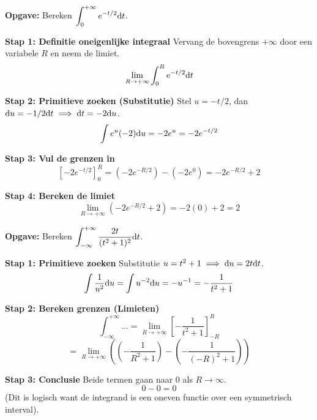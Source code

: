 \begin{oefenblok}
\textbf{Opgave:} Bereken $\displaystyle \int_0^{+\infty} e^{-t/2} \mathrm{d} t$.

\textbf{Stap 1: Definitie oneigenlijke integraal}
Vervang de bovengrens $+\infty$ door een variabele $R$ en neem de limiet.
\[ \lim_{R \to +\infty} \int_0^R e^{-t/2} \mathrm{d} t \]

\textbf{Stap 2: Primitieve zoeken (Substitutie)}
Stel $u = -t/2$, dan $\mathrm{d} u = -1/2 \mathrm{d} t \implies \mathrm{d} t = -2 \mathrm{d} u$.
\[ \int e^u (-2) \mathrm{d} u = -2e^u = -2e^{-t/2} \]

\textbf{Stap 3: Vul de grenzen in}
\[ \left[ -2e^{-t/2} \right]_0^R = (-2e^{-R/2}) - (-2e^0) = -2e^{-R/2} + 2 \]

\textbf{Stap 4: Bereken de limiet}
\[ \boxed{\lim_{R \to +\infty} (-2e^{-R/2} + 2) = -2(0) + 2 = 2} \]
\end{oefenblok}

\begin{oefenblok}
\textbf{Opgave:} Bereken $\displaystyle \int_{-\infty}^{+\infty} \frac{2t}{(t^2+1)^2} \mathrm{d} t$.

\textbf{Stap 1: Primitieve zoeken}
Substitutie $u = t^2+1 \implies \mathrm{d} u = 2t \mathrm{d} t$.
\[ \int \frac{1}{u^2} \mathrm{d} u = \int u^{-2} \mathrm{d} u = -u^{-1} = -\frac{1}{t^2+1} \]

\textbf{Stap 2: Bereken grenzen (Limieten)}
\[ \int_{-\infty}^{+\infty} \dots = \lim_{R \to +\infty} \left[ -\frac{1}{t^2+1} \right]_{-R}^{R} \]
\[ = \lim_{R \to +\infty} \left( \left(-\frac{1}{R^2+1}\right) - \left(-\frac{1}{(-R)^2+1}\right) \right) \]

\textbf{Stap 3: Conclusie}
Beide termen gaan naar 0 als $R \to \infty$.
\[ \boxed{0 - 0 = 0} \]
(Dit is logisch want de integrand is een oneven functie over een symmetrisch interval).
\end{oefenblok}

